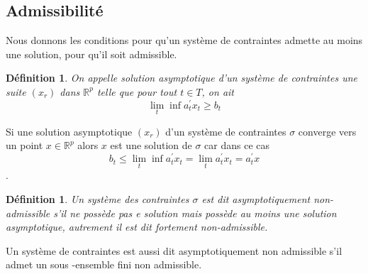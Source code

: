 \documentclass[11pt]{report}
\newenvironment{boxdefinition}
{\begin{tcolorbox}
		[enhanced jigsaw,breakable,pad at break*=1mm,
		colback=black!5!white,boxrule=0pt,frame hidden,
		borderline west={1.5mm}{-2mm}{blue}]}
	{\end{tcolorbox}}
\theoremstyle{styletheorem}
\theoremstyle{styledef}
\newtheorem{definitions}[theoreme]{Définition}
\theoremstyle{remark}
\newenvironment{definition}{\vspace*{0.3cm}\begin{boxdefinition}\begin{definitions}}{\end{definitions}\end{boxdefinition}\vspace*{0.3cm}}
\newcommand{\R}{\ensuremath{\mathbb{R}}}
\begin{document}
\subsection*{Admissibilité}
Nous donnons les conditions pour qu'un système de contraintes admette au moins une solution, pour qu'il soit admissible.
\begin{definition}
	On appelle solution asymptotique d'un système de contraintes une suite  $(x_r)$ dans $\R^p$ telle que pour tout $t \in T$, on ait 
	$$\lim_t \inf a_t^\prime x_t \geq b_t$$ 
\end{definition}
Si une solution asymptotique $(x_r)$ d'un système de contraintes $\sigma$ converge vers un point $x\in \R^p$ alors $x$ est une solution de $\sigma$ car dans ce cas 
$$b_t \leq \lim_t \inf a_t^\prime x_t = \lim_t  a_t^\prime x_t = a_t^\prime x$$.
\begin{definition}
	Un système des contraintes $\sigma$ est dit asymptotiquement non-admissible s’il ne possède pas e solution mais possède au moins une solution asymptotique, autrement il est dit fortement non-admissible.
\end{definition}
Un système de contraintes est aussi dit asymptotiquement non admissible s'il admet un sous -ensemble fini non admissible.
\end{document}
